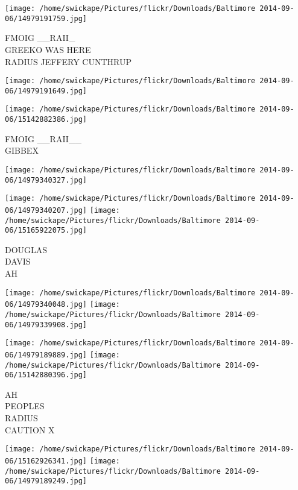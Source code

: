 \documentclass[10pt,letterpaper]{article}
\begin{document}
\vspace{0.25in}
\texttt{[image: /home/swickape/Pictures/flickr/Downloads/Baltimore 2014-09-06/14979191759.jpg]}

FMOIG \_\_RAII\_\\
GREEKO WAS HERE\\
RADIUS JEFFERY CUNTHRUP\\
\pagebreak

\texttt{[image: /home/swickape/Pictures/flickr/Downloads/Baltimore 2014-09-06/14979191649.jpg]}

\vspace{0.25in}
\texttt{[image: /home/swickape/Pictures/flickr/Downloads/Baltimore 2014-09-06/15142882386.jpg]}

FMOIG \_\_RAII\_\_\\
GIBBEX\\
\pagebreak

\texttt{[image: /home/swickape/Pictures/flickr/Downloads/Baltimore 2014-09-06/14979340327.jpg]}

\vspace{0.25in}
\texttt{[image: /home/swickape/Pictures/flickr/Downloads/Baltimore 2014-09-06/14979340207.jpg]}
\texttt{[image: /home/swickape/Pictures/flickr/Downloads/Baltimore 2014-09-06/15165922075.jpg]}

DOUGLAS\\
DAVIS\\
AH\\
\pagebreak

\texttt{[image: /home/swickape/Pictures/flickr/Downloads/Baltimore 2014-09-06/14979340048.jpg]}
\texttt{[image: /home/swickape/Pictures/flickr/Downloads/Baltimore 2014-09-06/14979339908.jpg]}

\texttt{[image: /home/swickape/Pictures/flickr/Downloads/Baltimore 2014-09-06/14979189889.jpg]}
\texttt{[image: /home/swickape/Pictures/flickr/Downloads/Baltimore 2014-09-06/15142880396.jpg]}

AH\\
PEOPLES\\
RADIUS\\
CAUTION X\\
\pagebreak

\texttt{[image: /home/swickape/Pictures/flickr/Downloads/Baltimore 2014-09-06/15162926341.jpg]}
\texttt{[image: /home/swickape/Pictures/flickr/Downloads/Baltimore 2014-09-06/14979189249.jpg]}
\end{document}

